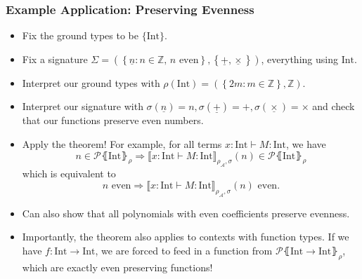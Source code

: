 \documentclass[aspectratio=169]{beamer}
\begin{document}
\begin{frame}
\frametitle{Example Application: Preserving Evenness}

\pause

\begin{itemize}
    \item Fix the ground types to be $\{\text{Int}\}$.
    \pause
    \item Fix a signature $\Sigma = \left(\left\{\underline{n} : n \in \mathbb{Z},\, n \text{ even}\right\}, \left\{\underline{+}, \underline{\times}\right\}\right)$, everything using $\text{Int}$.
    \pause
    \item Interpret our ground types with $\rho(\text{Int}) = \left(\left\{2m : m \in \mathbb{Z}\right\}, \mathbb{Z}\right)$.
    \pause
    \item Interpret our signature with $\sigma\left(\underline{n}\right) = n, \sigma\left(\underline{+}\right) = +, \sigma\left(\underline{\times}\right) = \times$ and check that our functions preserve even numbers.
    \pause
    \item Apply the theorem! For example, for all terms $x : \text{Int} \vdash M : \text{Int}$, we have
    \[
    n \in \mathcal{P}\lBrace \text{Int} \rBrace_\rho \Rightarrow \llbracket x : \text{Int} \vdash M : \text{Int} \rrbracket_{\rho_{\mathcal{A}}, \sigma}(n) \in \mathcal{P}\lBrace \text{Int} \rBrace_\rho
    \]
    which is equivalent to
    \[
    n \text{ even} \Rightarrow \llbracket x : \text{Int} \vdash M : \text{Int} \rrbracket_{\rho_{\mathcal{A}}, \sigma}(n) \text{ even}.
    \]
    \vspace{-12pt}
    \pause
    \item Can also show that all polynomials with even coefficients preserve evenness.
    \item Importantly, the theorem also applies to contexts with function types.
    If we have $f : \text{Int} \to \text{Int}$, we are forced to feed in a function from $\mathcal{P}\lBrace \text{Int} \to \text{Int} \rBrace_\rho$, which are exactly even preserving functions!
\end{itemize}

\end{frame}
\end{document}

